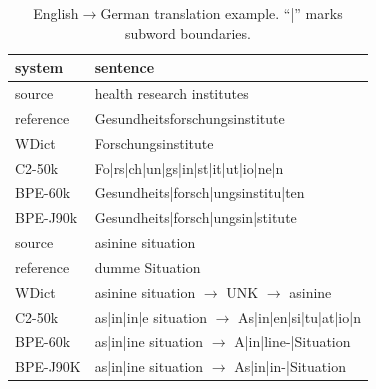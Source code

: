 \documentclass[11pt]{article}
\newcommand{\pipe}{{\color{gray}|}}
\begin{document}
\begin{table}
\centering
\small
\begin{tabular}{l|l}
system & sentence\\
\hline
source & health research institutes \\ 
reference & Gesundheitsforschungsinstitute \\
WDict & Forschungsinstitute \\
C2-50k & Fo\pipe rs\pipe ch\pipe un\pipe gs\pipe in\pipe st\pipe it\pipe ut\pipe io\pipe ne\pipe n\\
BPE-60k & Gesundheits\pipe forsch\pipe ungsinstitu\pipe ten \\
BPE-J90k & Gesundheits\pipe forsch\pipe ungsin\pipe stitute \\
\hline
source & asinine situation \\ 
reference & dumme Situation \\
WDict & asinine situation $\rightarrow$ UNK $\rightarrow$ asinine \\
C2-50k & as\pipe in\pipe in\pipe e situation $\rightarrow$ As\pipe in\pipe en\pipe si\pipe tu\pipe at\pipe io\pipe n\\
BPE-60k & as\pipe in\pipe ine situation $\rightarrow$ A\pipe in\pipe line-\pipe Situation \\
BPE-J90K & as\pipe in\pipe ine situation $\rightarrow$ As\pipe in\pipe in-\pipe Situation \\
\end{tabular}
\caption{English$\to$German translation example. ``\pipe '' marks subword boundaries.}
\label{examples-de}
\end{table}
\end{document}

